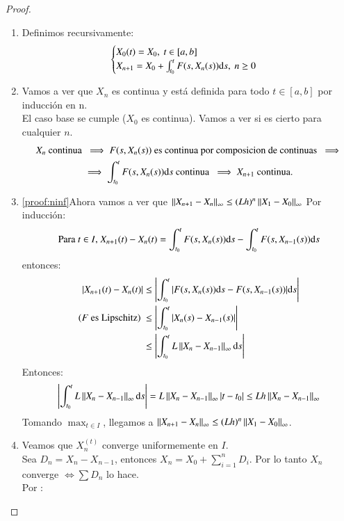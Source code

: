 \begin{proof}
\begin{enumerate}
        \begin{enumerate}
        \item Definimos recursivamente:
            $$
                \begin{cases}
                    X_0(t) = X_0,\ t\in[a, b]\\
                    X_{n+1} = X_0 + \int_{t_0}^t F(s, X_n(s)) \mathrm{d} s,\ n \geq 0
                \end{cases}
            $$
        \item Vamos a ver que $X_n$ es continua y está definida para todo $t \in [a, b]$ por inducción en n.\\
            El caso base se cumple ($X_0$ es continua). Vamos a ver si es cierto para cualquier $n$.
            \begin{gather*}
                X_n \text{ continua } \implies F(s, X_n(s)) \text{ es continua por composicion de continuas } \implies \\
                \implies \int_{t_0}^t F(s, X_n(s)) \mathrm{d} s \text{ continua } \implies X_{n+1} \text{ continua.}
            \end{gather*}
        \item \ref{proof:ninf}Ahora vamos a ver que $\left|\left|X_{n+1} - X_n\right|\right|_\infty \leq (Lh)^n \left|\left|X_1 - X_0\right|\right|_\infty$ Por inducción:
        $$
            \text{Para $t \in I$, }
            X_{n+1}(t) - X_n(t) = \int_{t_0}^t F(s, X_{n}(s)) \mathrm{d} s - \int_{t_0}^t F(s, X_{n-1}(s)) \mathrm{d} s
        $$
        entonces:
        \begin{align*}
            |X_{n+1}(t) - X_n(t)| &\leq \left|\int_{t_0}^t |F(s, X_{n}(s)) \mathrm{d} s - F(s, X_{n-1}(s))| \mathrm{d} s\right|\\
            \text{($F$ es Lipschitz) }&\leq \left| \int_{t_0}^t |X_n(s) - X_{n-1}(s)| \right|\\
            &\leq \left| \int_{t_0}^t L \left|\left|X_n - X_{n-1}\right|\right|_\infty \mathrm{d} s \right|
        \end{align*}
        Entonces:
        $$
            \left| \int_{t_0}^t L \left|\left|X_n - X_{n-1}\right|\right|_\infty \mathrm{d} s \right| = L \left|\left|X_n - X_{n-1}\right|\right|_\infty |t-t_0| \leq Lh \left|\left|X_n - X_{n-1}\right|\right|_\infty
        $$
        Tomando $\max_{t\in I}$, llegamos a $\left|\left|X_{n+1} - X_n\right|\right|_\infty \leq (Lh)^n \left|\left|X_1 - X_0\right|\right|_\infty$.
        \item Veamos que $X_n^(t)$ converge uniformemente en $I$.\\
        Sea $D_n = X_n - X_{n-1}$, entonces $X_n = X_0 + \sum_{i=1}^n D_i$. Por lo tanto $X_n$ converge $\iff \sum D_n$ lo hace.\\
        Por \label{proof:ninf}:

\end{enumerate}
\end{enumerate}
\end{proof}
